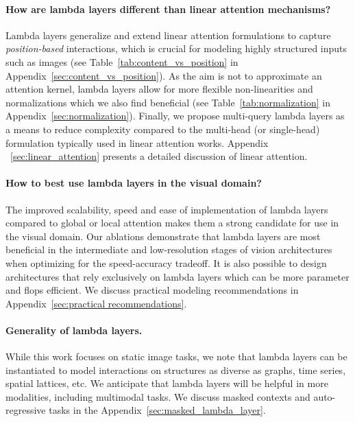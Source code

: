 \documentclass{article} \usepackage{iclr2021_conference,times}
\begin{document}
\vspace{-0.1cm}
\paragraph{How are lambda layers different than linear attention mechanisms?}
Lambda layers generalize and extend linear attention formulations to capture \emph{position-based} interactions, which is crucial for modeling highly structured inputs such as images (see Table~\ref{tab:content_vs_position} in Appendix~\ref{sec:content_vs_position}).
As the aim is not to approximate an attention kernel, lambda layers allow for more flexible non-linearities and normalizations which we also find beneficial (see Table~\ref{tab:normalization} in Appendix~\ref{sec:normalization}).
Finally, we propose multi-query lambda layers as a means to reduce complexity compared to the multi-head (or single-head) formulation typically used in linear attention works.
Appendix ~\ref{sec:linear_attention} presents a detailed discussion of linear attention.

\vspace{-0.1cm}
\paragraph{How to best use lambda layers in the visual domain?}
The improved scalability, speed and ease of implementation of lambda layers compared to global or local attention makes them a strong candidate for use in the visual domain.
Our ablations demonstrate that lambda layers are most beneficial in the intermediate and low-resolution stages of vision architectures when optimizing for the speed-accuracy tradeoff.
It is also possible to design architectures that rely exclusively on lambda layers which can be more parameter and flops efficient.
We discuss practical modeling recommendations in Appendix~\ref{sec:practical recommendations}.

\vspace{-0.1cm}
\paragraph{Generality of lambda layers.}
While this work focuses on static image tasks, we note that lambda layers can be instantiated to model interactions on structures as diverse as graphs, time series, spatial lattices, etc.
We anticipate that lambda layers will be helpful in more modalities, including multimodal tasks.
We discuss masked contexts and auto-regressive tasks in the Appendix~\ref{sec:masked_lambda_layer}.
\end{document}
